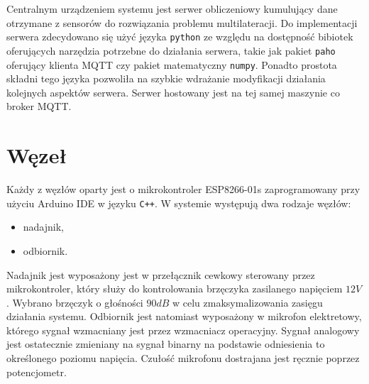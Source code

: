 Centralnym urządzeniem systemu jest serwer obliczeniowy kumulujący dane otrzymane z sensorów do rozwiązania problemu multilateracji. Do implementacji serwera zdecydowano się użyć języka \texttt{python} ze względu na dostępność bibiotek oferujących narzędzia potrzebne do działania serwera, takie jak pakiet \texttt{paho} oferujący klienta MQTT czy pakiet matematyczny \texttt{numpy}. Ponadto prostota składni tego języka pozwoliła na szybkie wdrażanie modyfikacji działania kolejnych aspektów serwera. Serwer hostowany jest na tej samej maszynie co broker MQTT.

\section{Węzeł}

Każdy z węzłów oparty jest o mikrokontroler ESP8266-01s zaprogramowany przy użyciu Arduino IDE w języku \texttt{C++}. W systemie występują dwa rodzaje węzłów:
\begin{itemize}
    \item nadajnik,
    \item odbiornik.
\end{itemize}
Nadajnik jest wyposażony jest w przełącznik cewkowy sterowany przez mikrokontroler, który służy do kontrolowania brzęczyka zasilanego napięciem $12V$. Wybrano brzęczyk o głośności $90dB$ w celu zmaksymalizowania zasięgu działania systemu. Odbiornik jest natomiast wyposażony w mikrofon elektretowy, którego sygnał wzmacniany jest przez wzmacniacz operacyjny. Sygnał analogowy jest ostatecznie zmieniany na sygnał binarny na podstawie odniesienia to określonego poziomu napięcia. Czułość mikrofonu dostrajana jest ręcznie poprzez potencjometr.